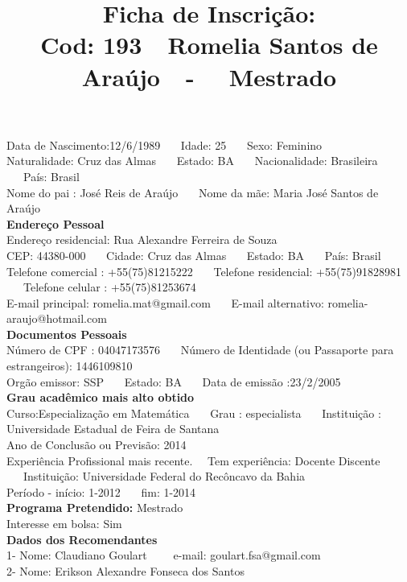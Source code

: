 \documentclass[11pt]{article}
\title{\vspace*{-4cm} Ficha de Inscrição: \\Cod: 193\ \ Romelia Santos de Araújo\ \ - \ \ Mestrado 
 }
\date{}
\begin{document}
\maketitle
\vspace*{-1.5cm}
\noindent Data de Nascimento:12/6/1989
\ \ \ Idade: 25   \ \ \ Sexo: Feminino
\\
Naturalidade: Cruz das Almas  
\ \ \  Estado: BA
\ \ \  Nacionalidade: Brasileira
\ \ \ País: Brasil
\\        
Nome do pai : José Reis de Araújo
\ \ \ Nome da mãe: Maria José Santos de Araújo          
\\[0.2cm]                     
\textbf{Endereço Pessoal} 
\\ 
\noindent Endereço residencial: Rua Alexandre Ferreira de Souza
\\
        CEP: 44380-000 
\ \ \ Cidade: Cruz das Almas 
\ \ \ Estado: BA 
\ \ \ País: Brasil
\\		
		Telefone comercial : +55(75)81215222
\ \ \ Telefone residencial: +55(75)91828981
\ \ \ Telefone celular : +55(75)81253674
\\
E-mail principal: romelia.mat@gmail.com
\ \ \ E-mail alternativo: romelia-araujo@hotmail.com 
\\[0.2cm] 
\textbf{Documentos Pessoais}
\\
\noindent Número de CPF : 04047173576
\ \ \ Número de Identidade (ou Passaporte para estrangeiros): 1446109810
\\
Orgão emissor: SSP
\ \ \ Estado: BA
\ \ \ Data de emissão :23/2/2005
\\[0.3cm]
\textbf{Grau acadêmico mais alto obtido}
\\	
Curso:Especialização em Matemática
\ \ \ Grau : especialista
\ \ \ Instituição : Universidade Estadual de Feira de Santana
\\			
Ano de Conclusão ou Previsão: 2014
\\ 
Experiência Profissional mais recente. \ \  
Tem experiência: Docente Discente  
\ \ \ Instituição: Universidade Federal do Recôncavo da Bahia
\\  
Período - início: 1-2012
\ \ \ fim: 1-2014
\\[0.2cm] 
\textbf{Programa Pretendido:} Mestrado\\
Interesse em bolsa: Sim
\\[0.3cm]		
\textbf{Dados dos Recomendantes} 
\\
1- Nome: Claudiano Goulart
\ \ \ \  e-mail: goulart.fsa@gmail.com 
\\
2- Nome: Erikson Alexandre Fonseca dos Santos
\end{document}
